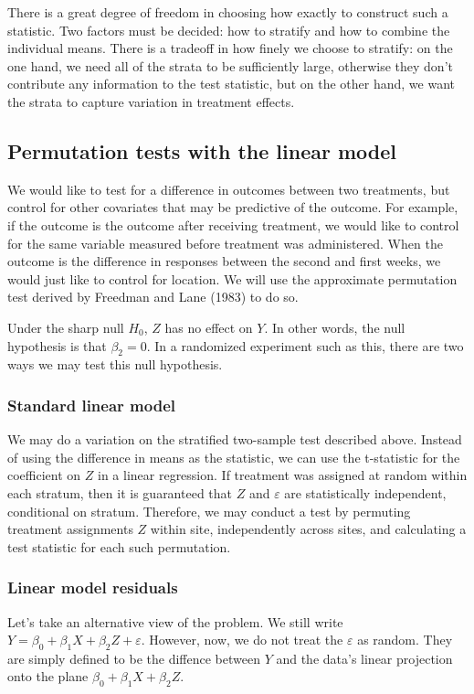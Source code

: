 \documentclass[11pt]{article}
\newcommand{\todo}[1]{{\color{red}{TO DO: \sc #1}}}
\begin{document}
There is a great degree of freedom in choosing how exactly to construct such a statistic.
Two factors must be decided: how to stratify and how to combine the individual means.
There is a tradeoff in how finely we choose to stratify:
on the one hand, we need all of the strata to be sufficiently large, otherwise they don't contribute any information to the test statistic,
 but on the other hand, we want the strata to capture variation in treatment effects.
\todo{discussion of NPC and cite papers}


\subsection{Permutation tests with the linear model}
We would like to test for a difference in outcomes between two treatments, but control for other covariates that may be predictive of the outcome.
For example, if the outcome is the outcome after receiving treatment, we would like to control for the same variable measured before treatment was administered.
When the outcome is the difference in responses between the second and first weeks, we would just like to control for location.
We will use the approximate permutation test derived by Freedman and Lane (1983) to do so.

Under the sharp null $H_0$, $Z$ has no effect on $Y$.
In other words, the null hypothesis is that $\beta_2 = 0$.
In a randomized experiment such as this, there are two ways we may test this null hypothesis.

\subsubsection{Standard linear model}
We may do a variation on the stratified two-sample test described above.
Instead of using the difference in means as the statistic, we can use the t-statistic for the coefficient on $Z$ in a linear regression.
If treatment was assigned at random within each stratum, then it is guaranteed that $Z$ and $\varepsilon$ are statistically independent, conditional on stratum.
Therefore, we may conduct a test by permuting treatment assignments $Z$ within site, independently across sites, and calculating a test statistic for each such permutation.

\subsubsection{Linear model residuals}

Let's take an alternative view of the problem.
We still write $Y = \beta_0 + \beta_1 X + \beta_2 Z + \varepsilon$.
However, now, we do not treat the $\varepsilon$ as random.
They are simply defined to be the diffence between $Y$ and the data's linear projection onto the plane $\beta_0 + \beta_1 X + \beta_2 Z$.
\end{document}
